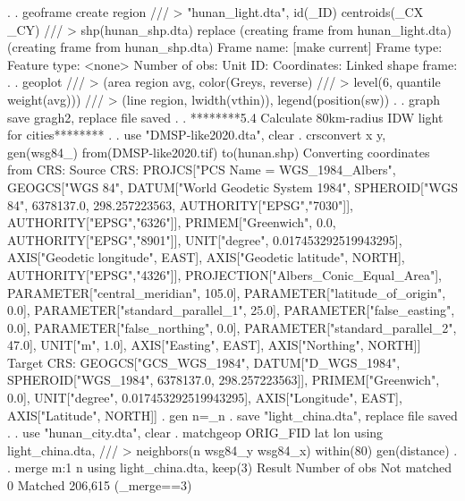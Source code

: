 . 
. geoframe create region     ///
>          "hunan_light.dta", id(_ID) centroids(_CX _CY) ///
>           shp(hunan_shp.dta) replace
(creating frame {} from hunan_light.dta)
(creating frame {} from hunan_shp.dta)
{\smallskip}
            Frame name: {} [make current]
            Frame type: {}
          Feature type: <none>
         Number of obs: {}
               Unit ID: {}
           Coordinates: {}
    Linked shape frame: {}
{\smallskip}
. 
. geoplot ///
>     (area region avg, color(Greys, reverse) ///
>                 level(6, quantile weight(avg))) ///
>     (line region, lwidth(vthin)), legend(position(sw))
{\smallskip}
.  
. graph save gragh2, replace
file {} saved
{\smallskip}
. 
. ********5.4 Calculate 80km-radius IDW light for cities********
. 
. use "DMSP-like2020.dta", clear
{\smallskip}
. crsconvert x y, gen(wsg84_) from(DMSP-like2020.tif) to(hunan.shp)
Converting coordinates from CRS:
Source CRS: PROJCS["PCS Name = WGS_1984_Albers", 
  GEOGCS["WGS 84", 
    DATUM["World Geodetic System 1984", 
      SPHEROID["WGS 84", 6378137.0, 298.257223563, AUTHORITY["EPSG","7030"]], 
      AUTHORITY["EPSG","6326"]], 
    PRIMEM["Greenwich", 0.0, AUTHORITY["EPSG","8901"]], 
    UNIT["degree", 0.017453292519943295], 
    AXIS["Geodetic longitude", EAST], 
    AXIS["Geodetic latitude", NORTH], 
    AUTHORITY["EPSG","4326"]], 
  PROJECTION["Albers_Conic_Equal_Area"], 
  PARAMETER["central_meridian", 105.0], 
  PARAMETER["latitude_of_origin", 0.0], 
  PARAMETER["standard_parallel_1", 25.0], 
  PARAMETER["false_easting", 0.0], 
  PARAMETER["false_northing", 0.0], 
  PARAMETER["standard_parallel_2", 47.0], 
  UNIT["m", 1.0], 
  AXIS["Easting", EAST], 
  AXIS["Northing", NORTH]]
Target CRS: GEOGCS["GCS_WGS_1984", 
  DATUM["D_WGS_1984", 
    SPHEROID["WGS_1984", 6378137.0, 298.257223563]], 
  PRIMEM["Greenwich", 0.0], 
  UNIT["degree", 0.017453292519943295], 
  AXIS["Longitude", EAST], 
  AXIS["Latitude", NORTH]]
{\smallskip}
. gen n=_n
{\smallskip}
. save "light_china.dta", replace
file{} saved
{\smallskip}
. 
. use "hunan_city.dta", clear
{\smallskip}
. matchgeop ORIG_FID lat lon using light_china.dta, ///
>                neighbors(n wsg84_y wsg84_x) within(80) gen(distance)
{\smallskip}
. 
. merge m:1 n using light_china.dta, keep(3)
{\smallskip}
    Result                      Number of obs
    Not matched                             0
    Matched                           206,615  (_merge==3)

